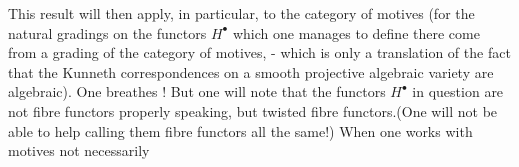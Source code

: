  This result will then apply, in particular, to the category of  motives (for the  natural gradings on the functors $H^\bullet$ which one manages to define there  come from a grading of the category of motives, - which is only a translation of the fact that the  Kunneth correspondences on a smooth projective algebraic variety are algebraic). One breathes ! But one will note that the functors $H^\bullet$ in question are not fibre functors properly speaking, but twisted fibre functors.(One will not be able to help calling them fibre functors all the same!) When one works with motives not necessarily
